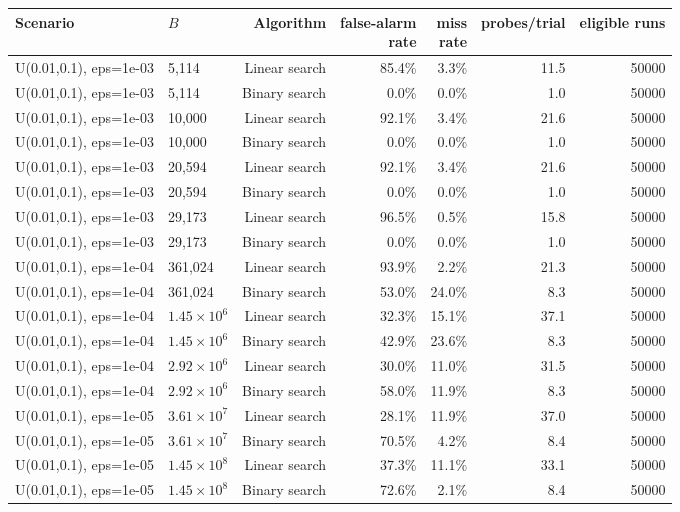 \begin{tabular}{llrrrrr}
\toprule
Scenario & $B$ & Algorithm & \makecell{false-alarm\\rate} & \makecell{miss\\rate} & probes/trial & eligible runs \\
\midrule
U(0.01,0.1), eps=1e-03 & 5,114 & Linear search & 85.4\% & 3.3\% & 11.5 & 50000 \\
U(0.01,0.1), eps=1e-03 & 5,114 & Binary search & 0.0\% & 0.0\% & 1.0 & 50000 \\
U(0.01,0.1), eps=1e-03 & 10,000 & Linear search & 92.1\% & 3.4\% & 21.6 & 50000 \\
U(0.01,0.1), eps=1e-03 & 10,000 & Binary search & 0.0\% & 0.0\% & 1.0 & 50000 \\
U(0.01,0.1), eps=1e-03 & 20,594 & Linear search & 92.1\% & 3.4\% & 21.6 & 50000 \\
U(0.01,0.1), eps=1e-03 & 20,594 & Binary search & 0.0\% & 0.0\% & 1.0 & 50000 \\
U(0.01,0.1), eps=1e-03 & 29,173 & Linear search & 96.5\% & 0.5\% & 15.8 & 50000 \\
U(0.01,0.1), eps=1e-03 & 29,173 & Binary search & 0.0\% & 0.0\% & 1.0 & 50000 \\
U(0.01,0.1), eps=1e-04 & 361,024 & Linear search & 93.9\% & 2.2\% & 21.3 & 50000 \\
U(0.01,0.1), eps=1e-04 & 361,024 & Binary search & 53.0\% & 24.0\% & 8.3 & 50000 \\
U(0.01,0.1), eps=1e-04 & $1.45\times 10^{6}$ & Linear search & 32.3\% & 15.1\% & 37.1 & 50000 \\
U(0.01,0.1), eps=1e-04 & $1.45\times 10^{6}$ & Binary search & 42.9\% & 23.6\% & 8.3 & 50000 \\
U(0.01,0.1), eps=1e-04 & $2.92\times 10^{6}$ & Linear search & 30.0\% & 11.0\% & 31.5 & 50000 \\
U(0.01,0.1), eps=1e-04 & $2.92\times 10^{6}$ & Binary search & 58.0\% & 11.9\% & 8.3 & 50000 \\
U(0.01,0.1), eps=1e-05 & $3.61\times 10^{7}$ & Linear search & 28.1\% & 11.9\% & 37.0 & 50000 \\
U(0.01,0.1), eps=1e-05 & $3.61\times 10^{7}$ & Binary search & 70.5\% & 4.2\% & 8.4 & 50000 \\
U(0.01,0.1), eps=1e-05 & $1.45\times 10^{8}$ & Linear search & 37.3\% & 11.1\% & 33.1 & 50000 \\
U(0.01,0.1), eps=1e-05 & $1.45\times 10^{8}$ & Binary search & 72.6\% & 2.1\% & 8.4 & 50000 \\

\end{tabular}
